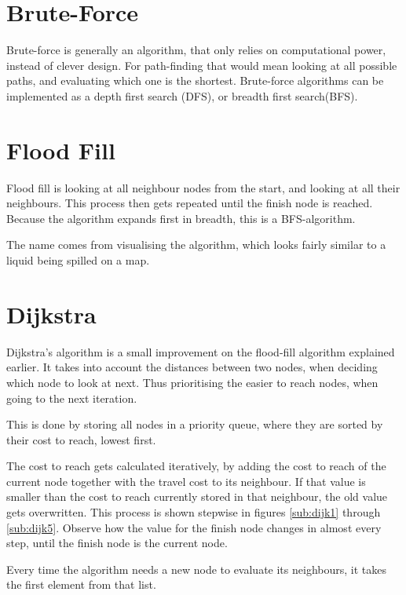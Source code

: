 \section{Brute-Force}\label{sec:brute}
Brute-force is generally an algorithm,
that only relies on computational power,
instead of clever design.
For path-finding that would mean looking at all possible paths,
and evaluating which one is the shortest.
Brute-force algorithms can be implemented as a depth first search (DFS), or breadth first search(BFS).

\section{Flood Fill}\label{sec:fill}
Flood fill is looking at all neighbour nodes from the start,
and looking at all their neighbours.
This process then gets repeated until the finish node is reached.
Because the algorithm expands first in breadth,
this is a BFS-algorithm.

The name comes from visualising the algorithm,
which looks fairly similar to a liquid being spilled on a map.
\cite{Jaimini2017}

\section{Dijkstra}\label{sec:dijkstra}
Dijkstra's algorithm is a small improvement on the flood-fill algorithm explained earlier.
It takes into account the distances between two nodes,
when deciding which node to look at next.
Thus prioritising the easier to reach nodes, when going to the next iteration.

This is done by storing all nodes in a priority queue,
where they are sorted by their cost to reach, lowest first.

The cost to reach gets calculated iteratively,
by adding the cost to reach of the current node together with the travel cost to its neighbour.
If that value is smaller than the cost to reach currently stored in that neighbour,
the old value gets overwritten.
This process is shown stepwise in figures \ref{sub:dijk1} through \ref{sub:dijk5}.
Observe how the value for the finish node changes in almost every step,
until the finish node is the current node.

Every time the algorithm needs a new node to evaluate its neighbours,
it takes the first element from that list.

